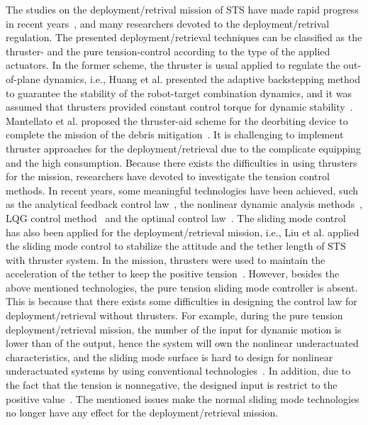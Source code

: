 \documentclass[conference]{IEEEtran}
\theoremstyle{plain}
\begin{document}
The studies on the deployment/retrival mission of STS have made rapid progress in recent years~\cite{cai2014deployment,ma2014coordinated,jung2015nonlinear,li2016libration}, and many researchers devoted to the deployment/retrival regulation. The presented deployment/retrieval techniques can be classified as the thruster- and the pure tension-control according to the type of the applied actuators. In the former scheme, the thruster is usual applied to regulate the out-of-plane dynamics, i.e., Huang et al. presented the adaptive backstepping method to guarantee the stability of the robot-target combination dynamics, and it was assumed that thrusters provided constant control torque for dynamic stability~\cite{huang2015adaptive}. Mantellato et al. proposed the thruster-aid scheme for the deorbiting device to complete the mission of the debris mitigation~\cite{mantellato2015thrust}. It is  challenging to implement thruster approaches for the deployment/retrieval due to the complicate equipping and the high consumption. Because there exists the difficulties in using thrusters for the mission, researchers have devoted to investigate the tension control methods. In recent years, some meaningful technologies have been achieved, such as the analytical feedback control law~\cite{wen2015space}, the nonlinear dynamic analysis methods~\cite{jung2015nonlinear}, LQG control method~\cite{yousefian2015anti} and the optimal control law~\cite{steindl2015optimal}. The sliding mode control has also been applied for the deployment/retrieval mission, i.e., Liu et al. applied the sliding mode control to stabilize the attitude and the tether length of STS with thruster system. In the mission, thrusters were used to maintain the acceleration of the tether to keep the positive tension~\cite{yingying2012variable}. However, besides the above mentioned technologies, the pure tension sliding mode controller is absent. This is because that there exists some difficulties in designing the control law for deployment/retrieval without thrusters. For example, during the pure tension deployment/retrieval mission, the number of the input for dynamic motion is lower than of the output, hence the system will own the nonlinear underactuated characteristics, and the sliding mode surface is hard to design for nonlinear underactuated systems by using conventional technologies~\cite{edwards2006advances}. In addition, due to the fact that the tension is nonnegative, the designed input is restrict to the positive value~\cite{yingying2012variable}. The mentioned issues make the normal sliding mode technologies no longer have any effect for the deployment/retrieval mission.\par
\end{document}
